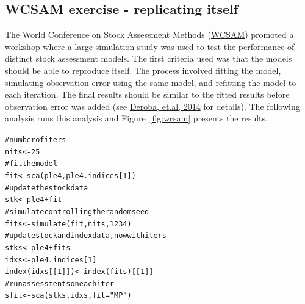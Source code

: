 \documentclass[a4paper,english,10pt]{article}\usepackage[]{graphicx}\usepackage[]{color}
\makeatletter
\newcommand{\hlnum}[1]{\textcolor[rgb]{0.063,0.58,0.627}{#1}}%
\newcommand{\hlstr}[1]{\textcolor[rgb]{0.063,0.58,0.627}{#1}}%
\newcommand{\hlcom}[1]{\textcolor[rgb]{0.588,0.588,0.588}{#1}}%
\newcommand{\hlopt}[1]{\textcolor[rgb]{0.196,0.196,0.196}{#1}}%
\newcommand{\hlstd}[1]{\textcolor[rgb]{0.196,0.196,0.196}{#1}}%
\newcommand{\hlkwb}[1]{\textcolor[rgb]{0.627,0,0.314}{#1}}%
\newcommand{\hlkwc}[1]{\textcolor[rgb]{0,0.631,0.314}{#1}}%
\newcommand{\hlkwd}[1]{\textcolor[rgb]{0.78,0.227,0.412}{#1}}%
\newenvironment{kframe}{%
 \def\at@end@of@kframe{}%
 \ifinner\ifhmode%
  \def\at@end@of@kframe{\end{minipage}}%
  \begin{minipage}{\columnwidth}%
 \fi\fi%
 \def\FrameCommand##1{\hskip\@totalleftmargin \hskip-\fboxsep
 \colorbox{shadecolor}{##1}\hskip-\fboxsep
     \hskip-\linewidth \hskip-\@totalleftmargin \hskip\columnwidth}%
 \MakeFramed {\advance\hsize-\width
   \@totalleftmargin\z@ \linewidth\hsize
   \@setminipage}}%
 {\par\unskip\endMakeFramed%
 \at@end@of@kframe}
\newenvironment{knitrout}{}{} %
\makeatother
\begin{document}


\subsection{WCSAM exercise - replicating itself}

The World Conference on Stock Assessment Methods (\href{http://www.ices.dk/news-and-events/symposia/WCSAM-2013}{WCSAM}) promoted a workshop where a large simulation study was used to test the performance of distinct stock assessment models. The first criteria used was that the models should be able to reproduce itself. The process involved fitting the model, simulating observation error using the same model, and refitting the model to each iteration. The final results should be similar to the fitted results before observation error was added (see \href{http://icesjms.oxfordjournals.org/content/early/2014/01/18/icesjms.fst237.abstract}{Deroba, et.al, 2014} for details). The following analysis runs this analysis and Figure~\ref{fig:wcsam} presents the results.

\begin{knitrout}
\color{fgcolor}\begin{kframe}
\begin{alltt}
\hlcom{# number of iters}
\hlstd{nits} \hlkwb{<-} \hlnum{25}
\hlcom{# fit the model}
\hlstd{fit} \hlkwb{<-} \hlkwd{sca}\hlstd{(ple4, ple4.indices[}\hlnum{1}\hlstd{])}
\hlcom{# update the stock data}
\hlstd{stk} \hlkwb{<-} \hlstd{ple4} \hlopt{+} \hlstd{fit}
\hlcom{# simulate controlling the random seed}
\hlstd{fits} \hlkwb{<-} \hlkwd{simulate}\hlstd{(fit, nits,} \hlnum{1234}\hlstd{)}
\hlcom{# update stock and index data, now with iters}
\hlstd{stks} \hlkwb{<-} \hlstd{ple4} \hlopt{+} \hlstd{fits}
\hlstd{idxs} \hlkwb{<-} \hlstd{ple4.indices[}\hlnum{1}\hlstd{]}
\hlkwd{index}\hlstd{(idxs[[}\hlnum{1}\hlstd{]])} \hlkwb{<-} \hlkwd{index}\hlstd{(fits)[[}\hlnum{1}\hlstd{]]}
\hlcom{# run assessments on each iter}
\hlstd{sfit} \hlkwb{<-} \hlkwd{sca}\hlstd{(stks, idxs,} \hlkwc{fit} \hlstd{=} \hlstr{"MP"}\hlstd{)}
\end{alltt}
\end{kframe}
\end{knitrout}
\end{document}
